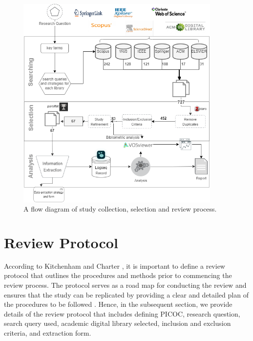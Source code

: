 \begin{figure}[H]
    \centering
    \includegraphics[width=0.9\textwidth]{images/newimages/slrmethoddiagram.drawio2.png}
    \caption{A flow diagram of study collection, selection and review process.}
    \label{fig:slr-proc}
\end{figure}




\section{Review Protocol}
According to Kitchenham and Charter  \cite{kitchenham_guidelines_2007}, it is important to define a review protocol that outlines the procedures and methods prior to commencing the review process. The protocol serves as a road map for conducting the review and ensures that the study can be replicated by providing a clear and detailed plan of the procedures to be followed \cite{carrera-rivera_how-conduct_2022}. Hence, in the subsequent section, we provide details of the review protocol that includes defining PICOC, research question, search query used, academic digital library selected, inclusion and exclusion criteria, and extraction form. 

